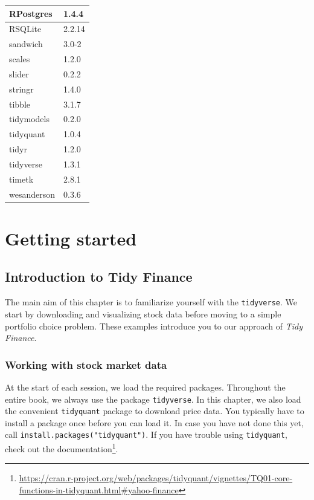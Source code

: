 \documentclass[
]{krantz}
\renewcommand{\href}[2]{#2\footnote{\url{#1}}}
\begin{document}
\begin{tabular}[t]{l|l}
\hline
RPostgres & 1.4.4\\
\hline
RSQLite & 2.2.14\\
\hline
sandwich & 3.0-2\\
\hline
scales & 1.2.0\\
\hline
slider & 0.2.2\\
\hline
stringr & 1.4.0\\
\hline
tibble & 3.1.7\\
\hline
tidymodels & 0.2.0\\
\hline
tidyquant & 1.0.4\\
\hline
tidyr & 1.2.0\\
\hline
tidyverse & 1.3.1\\
\hline
timetk & 2.8.1\\
\hline
wesanderson & 0.3.6\\
\hline
\end{tabular}

\hypertarget{part-getting-started}{%
\part*{Getting started}\label{part-getting-started}}


\hypertarget{introduction-to-tidy-finance}{%
\chapter{Introduction to Tidy Finance}\label{introduction-to-tidy-finance}}

The main aim of this chapter is to familiarize yourself with the \texttt{tidyverse}. We start by downloading and visualizing stock data before moving to a simple portfolio choice problem. These examples introduce you to our approach of \emph{Tidy Finance}.

\hypertarget{working-with-stock-market-data}{%
\section{Working with stock market data}\label{working-with-stock-market-data}}

At the start of each session, we load the required packages.
Throughout the entire book, we always use the package \texttt{tidyverse}.
In this chapter, we also load the convenient \texttt{tidyquant} package to download price data.
You typically have to install a package once before you can load it. In case you have not done this yet, call \texttt{install.packages("tidyquant")}.
If you have trouble using \texttt{tidyquant}, check out the \href{https://cran.r-project.org/web/packages/tidyquant/vignettes/TQ01-core-functions-in-tidyquant.html\#yahoo-finance}{documentation}.
\end{document}
